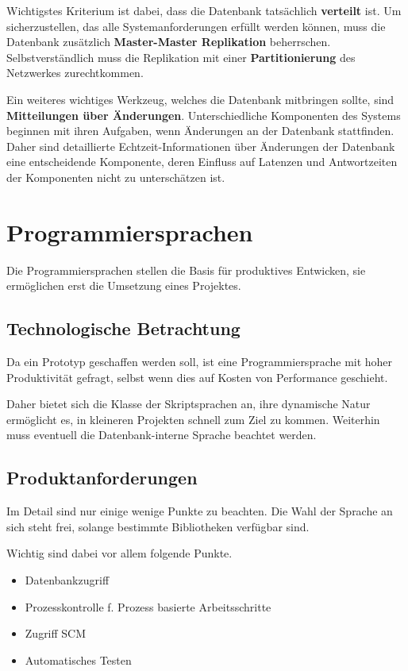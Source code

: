 Wichtigstes Kriterium ist dabei, dass die Datenbank tats\"achlich \textbf{verteilt} ist.
Um sicherzustellen, das alle Systemanforderungen erf\"ullt werden k\"onnen,
muss die Datenbank zus\"atzlich \textbf{Master-Master Replikation} beherrschen.
Selbstverst\"andlich muss die Replikation mit einer \textbf{Partitionierung} des Netzwerkes zurechtkommen.

Ein weiteres wichtiges Werkzeug, welches die Datenbank mitbringen sollte, sind \textbf{Mitteilungen über Änderungen}.
Unterschiedliche Komponenten des Systems beginnen mit ihren Aufgaben,
wenn Änderungen an der Datenbank stattfinden.
Daher sind detaillierte Echtzeit-Informationen über Änderungen der Datenbank eine entscheidende Komponente,
deren Einfluss auf Latenzen und Antwortzeiten der Komponenten nicht zu unterschätzen ist.


\section{Programmiersprachen}

Die Programmiersprachen stellen die Basis f\"ur produktives Entwicken,
sie erm\"oglichen erst die Umsetzung eines Projektes.

\subsection{Technologische Betrachtung}

Da ein Prototyp geschaffen werden soll,
ist eine Programmiersprache mit hoher Produktivit\"at gefragt,
selbst wenn dies auf Kosten von Performance geschieht.

Daher bietet sich die Klasse der Skriptsprachen an,
ihre dynamische Natur ermöglicht es,
in kleineren Projekten schnell zum Ziel zu kommen.
Weiterhin muss eventuell die Datenbank-interne Sprache beachtet werden.


\subsection{Produktanforderungen}

Im Detail sind nur einige wenige Punkte zu beachten.
Die Wahl der Sprache an sich steht frei,
solange bestimmte Bibliotheken verf\"ugbar sind.

Wichtig sind dabei vor allem folgende Punkte.
\begin{itemize}
    \item Datenbankzugriff 
    \item Prozesskontrolle f. Prozess basierte Arbeitsschritte
    \item Zugriff SCM
    \item Automatisches Testen
\end{itemize}

